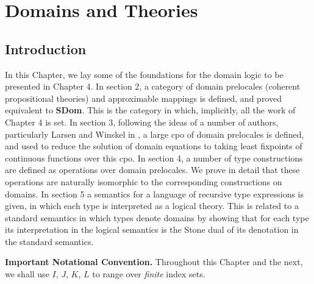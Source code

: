 \chapter{Domains and Theories}
\section{Introduction}
In this Chapter, we lay some of the foundations for the domain 
logic to be presented in Chapter 4. 
In section 2, a category of domain prelocales (coherent propositional theories) and approximable mappings is defined, 
and proved equivalent to {\bf SDom}. 
This is the category in which, implicitly, all the work of Chapter 4 is set. 
In section 3, following the ideas of a number of authors, particularly 
Larsen and Winskel in \cite{LW84}, 
a large cpo of domain prelocales is defined, and used to reduce the solution 
of domain equations to taking least fixpoints of continuous functions over this cpo. 
In section 4, a number of type constructions are defined as operations over domain prelocales. 
We prove in detail that these operations are naturally isomorphic to the corresponding constructions on domains. 
In section 5 a semantics for a language of recursive type expressions is given, in which each type is interpreted as a logical theory. 
This is related to a standard semantics in which types denote domains by 
showing that for each type its interpretation in the logical semantics is 
the Stone dual of its denotation in the standard semantics.

{\bf Important Notational Convention.}
Throughout this Chapter and the next, we shall use $I$, $J$, $K$, $L$
to range over {\em finite} index sets.
